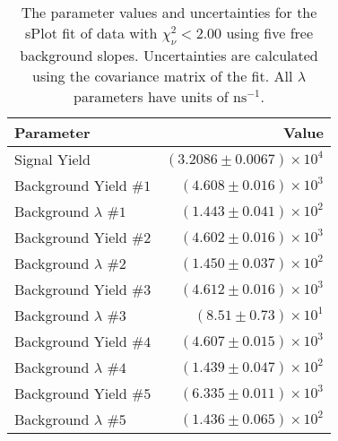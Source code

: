 
\begin{table}[ht]
    \begin{center}
        \begin{tabular}{lr}\toprule
            Parameter & Value \\\midrule
            Signal Yield & $(3.2086 \pm 0.0067) \times 10^{4}$ \\
            Background Yield $\#1$ & $(4.608 \pm 0.016) \times 10^{3}$ \\
            Background $\lambda$ $\#1$ & $(1.443 \pm 0.041) \times 10^{2}$ \\
            Background Yield $\#2$ & $(4.602 \pm 0.016) \times 10^{3}$ \\
            Background $\lambda$ $\#2$ & $(1.450 \pm 0.037) \times 10^{2}$ \\
            Background Yield $\#3$ & $(4.612 \pm 0.016) \times 10^{3}$ \\
            Background $\lambda$ $\#3$ & $(8.51 \pm 0.73) \times 10^{1}$ \\
            Background Yield $\#4$ & $(4.607 \pm 0.015) \times 10^{3}$ \\
            Background $\lambda$ $\#4$ & $(1.439 \pm 0.047) \times 10^{2}$ \\
            Background Yield $\#5$ & $(6.335 \pm 0.011) \times 10^{3}$ \\
            Background $\lambda$ $\#5$ & $(1.436 \pm 0.065) \times 10^{2}$ \\\bottomrule
        \end{tabular}
        \caption{The parameter values and uncertainties for the sPlot fit of data with $\chi^2_\nu < 2.00$ using five free background slopes. Uncertainties are calculated using the covariance matrix of the fit. All $\lambda$ parameters have units of $\si{\nano\second}^{-1}$.}\label{tab:splot-fit-results-chisqdof-2.00-free-5}
    \end{center}
\end{table}
